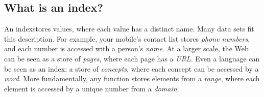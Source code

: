 \subsection{What is an index?}

An index\footnotemark stores values,
  where each value has a distinct name.
Many data sets fit this description.
For example,
  your mobile's contact list stores \emph{phone numbers},
  and each number is accessed with a person's \emph{name}.
At a larger scale,
  the Web can be seen as a store of \emph{pages},
  where each page has a \emph{URL}.
Even a language can be seen as an index:
  a store of \emph{concepts},
  where each concept can be accessed by a \emph{word}.
More fundamentally,
  any function stores elements from a \emph{range},
  where each element is accessed by a unique number from a \emph{domain}.





